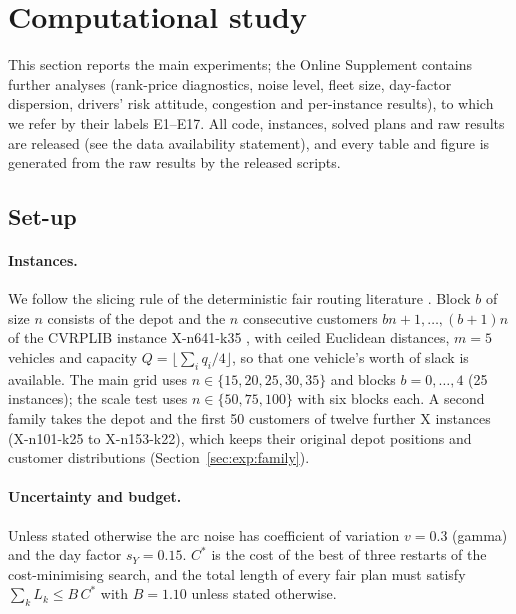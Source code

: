 \documentclass[11pt]{article}
\theoremstyle{definition}
\begin{document}

\section{Computational study}\label{sec:exp}

This section reports the main experiments; the Online Supplement contains
further analyses (rank-price diagnostics, noise level, fleet size, day-factor
dispersion, drivers' risk attitude, congestion and per-instance results), to
which we refer by their labels E1--E17. All code, instances, solved plans and
raw results are released (see the data availability statement), and every
table and figure is generated from the raw results by the released scripts.

\subsection{Set-up}\label{sec:exp:setup}
\paragraph{Instances.} We follow the slicing rule of the deterministic fair
routing literature \citep{ljubic2026fair}. Block $b$ of size $n$ consists of the
depot and the $n$ consecutive customers $bn+1,\dots,(b+1)n$ of the CVRPLIB
instance X-n641-k35 \citep{uchoa2017new}, with ceiled Euclidean distances,
$m=5$ vehicles and capacity $Q=\lfloor\sum_iq_i/4\rfloor$, so that one
vehicle's worth of slack is available. The main grid uses
$n\in\{15,20,25,30,35\}$ and blocks $b=0,\dots,4$ (25 instances); the scale
test uses $n\in\{50,75,100\}$ with six blocks each. A second family takes the
depot and the first 50 customers of twelve further X instances (X-n101-k25 to
X-n153-k22), which keeps their original depot positions and customer
distributions (Section~\ref{sec:exp:family}).

\paragraph{Uncertainty and budget.} Unless stated otherwise the arc noise has
coefficient of variation $v=0.3$ (gamma) and the day factor $s_Y=0.15$.
$C^\ast$ is the cost of the best of three restarts of the cost-minimising
search, and the total length of every fair plan must satisfy
$\sum_kL_k\le B\,C^\ast$ with $B=1.10$ unless stated otherwise.
\end{document}
